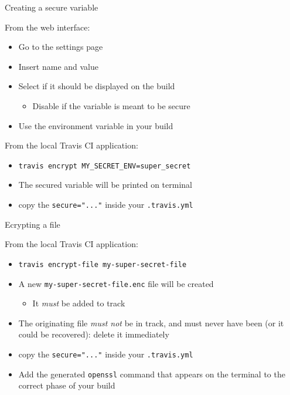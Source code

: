 \documentclass[presentation]{beamer}
\begin{document}
\begin{frame}{Creating a secure variable}
    \begin{block}{From the web interface:}
        \begin{itemize}
            \item Go to the settings page
            \item Insert name and value
            \item Select if it should be displayed on the build
            \begin{itemize}
                \item Disable if the variable is meant to be secure
            \end{itemize}
            \item Use the environment variable in your build
        \end{itemize}
    \end{block}
    \begin{block}{From the local Travis CI application:}
        \begin{itemize}
            \item \texttt{travis encrypt MY\_SECRET\_ENV=super\_secret}
            \item The secured variable will be printed on terminal
            \item copy the \texttt{secure="..."} inside your \texttt{.travis.yml}
        \end{itemize}
    \end{block}
\end{frame}

\begin{frame}{Ecrypting a file}
    \begin{block}{From the local Travis CI application:}
        \begin{itemize}
            \item \texttt{travis encrypt-file my-super-secret-file}
            \item A new \texttt{my-super-secret-file.enc} file will be created
            \begin{itemize}
                \item It \textit{must} be added to track
            \end{itemize}
            \item The originating file \textit{must not} be in track, and must never have been (or it could be recovered): delete it immediately
            \item copy the \texttt{secure="..."} inside your \texttt{.travis.yml}
            \item Add the generated \texttt{openssl} command that appears on the terminal to the correct phase of your build
        \end{itemize}
    \end{block}
\end{frame}
\end{document}
